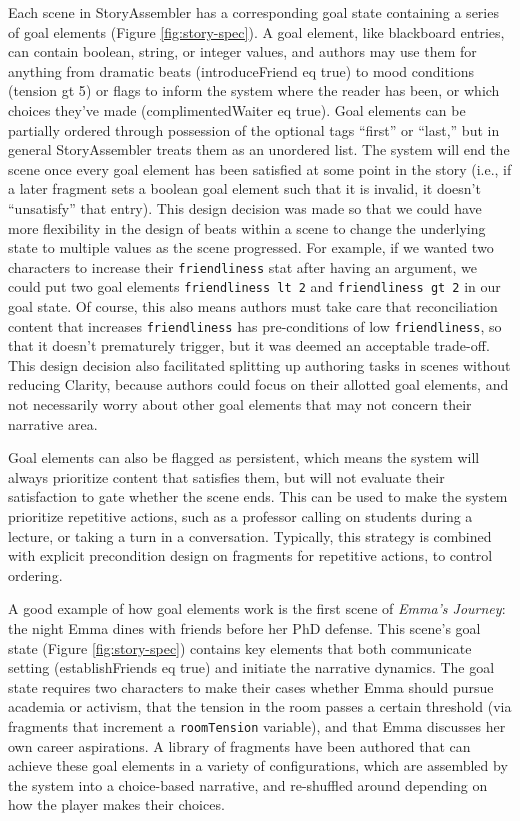 Each scene in StoryAssembler has a corresponding goal state containing a series of goal elements (Figure \ref{fig:story-spec}). A goal element, like blackboard entries, can contain boolean, string, or integer values, and authors may use them for anything from dramatic beats ({introduceFriend eq true}) to mood conditions ({tension gt 5}) or flags to inform the system where the reader has been, or which choices they've made ({complimentedWaiter eq true}). Goal elements can be partially ordered through possession of the optional tags ``first'' or ``last,'' but in general StoryAssembler treats them as an unordered list. The system will end the scene once every goal element has been satisfied at some point in the story (i.e., if a later fragment sets a boolean goal element such that it is invalid, it doesn't ``unsatisfy'' that entry). This design decision was made so that we could have more flexibility in the design of beats within a scene to change the underlying state to multiple values as the scene progressed. For example, if we wanted two characters to increase their \texttt{friendliness} stat after having an argument, we could put two goal elements \texttt{friendliness lt 2} and \texttt{friendliness gt 2} in our goal state. Of course, this also means authors must take care that reconciliation content that increases \texttt{friendliness} has pre-conditions of low \texttt{friendliness}, so that it doesn't prematurely trigger, but it was deemed an acceptable trade-off. This design decision also facilitated splitting up authoring tasks in scenes without reducing Clarity, because authors could focus on their allotted goal elements, and not necessarily worry about other goal elements that may not concern their narrative area.

Goal elements can also be flagged as persistent, which means the system will always prioritize content that satisfies them, but will not evaluate their satisfaction to gate whether the scene ends. This can be used to make the system prioritize repetitive actions, such as a professor calling on students during a lecture, or taking a turn in a conversation. Typically, this strategy is combined with explicit precondition design on fragments for repetitive actions, to control ordering.

A good example of how goal elements work is the first scene of \textit{Emma's Journey}: the night Emma dines with friends before her PhD defense. This scene's goal state (Figure \ref{fig:story-spec}) contains key elements that both communicate setting ({establishFriends eq true}) and initiate the narrative dynamics. The goal state requires two characters to make their cases whether Emma should pursue academia or activism, that the tension in the room passes a certain threshold (via fragments that increment a \texttt{roomTension} variable), and that Emma discusses her own career aspirations. A library of fragments have been authored that can achieve these goal elements in a variety of configurations, which are assembled by the system into a choice-based narrative, and re-shuffled around depending on how the player makes their choices.


